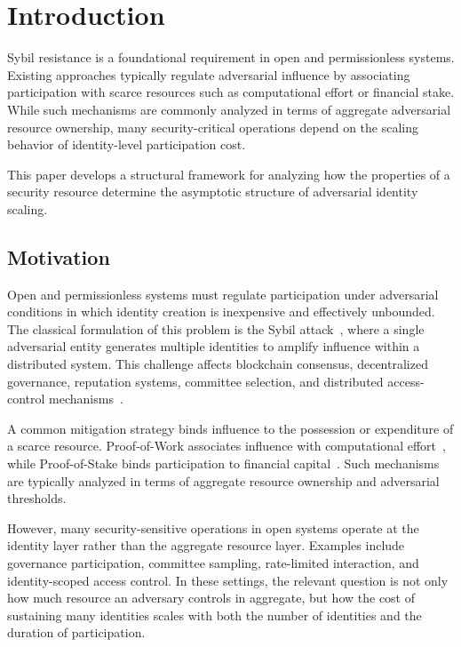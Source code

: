 \documentclass[journal]{IEEEtran}
\begin{document}
	\section{Introduction}
	
	Sybil resistance is a foundational requirement in open and
	permissionless systems.
	Existing approaches typically regulate adversarial influence
	by associating participation with scarce resources such as
	computational effort or financial stake.
	While such mechanisms are commonly analyzed in terms of
	aggregate adversarial resource ownership, many security-critical
	operations depend on the scaling behavior of identity-level
	participation cost.
	
	This paper develops a structural framework for analyzing
	how the properties of a security resource determine the
	asymptotic structure of adversarial identity scaling.
	
	\subsection{Motivation}
	
	Open and permissionless systems must regulate participation
	under adversarial conditions in which identity creation is
	inexpensive and effectively unbounded.
	The classical formulation of this problem is the Sybil
	attack~\cite{douceur2002sybil}, where a single adversarial
	entity generates multiple identities to amplify influence
	within a distributed system.
	This challenge affects blockchain consensus,
	decentralized governance, reputation systems,
	committee selection, and distributed access-control
	mechanisms~\cite{lamport1982byzantine,fischer1985flp,
		castro1999pbft,garay2015backbone,ren2019nakamoto,
		bonneau2015sok,narayanan2016bitcoinbook,
		gencer2018decentralization,decker2013information}.
	
	A common mitigation strategy binds influence to the
	possession or expenditure of a scarce resource.
	Proof-of-Work associates influence with computational
	effort~\cite{garay2015backbone},
	while Proof-of-Stake binds participation to financial
	capital~\cite{kiayias2017ouroboros}.
	Such mechanisms are typically analyzed in terms of aggregate
	resource ownership and adversarial thresholds.
	
	However, many security-sensitive operations in open systems
	operate at the identity layer rather than the aggregate
	resource layer.
	Examples include governance participation,
	committee sampling, rate-limited interaction,
	and identity-scoped access control.
	In these settings, the relevant question is not only how much
	resource an adversary controls in aggregate, but how the cost
	of sustaining many identities scales with both the number of
	identities and the duration of participation.
	
\end{document}
